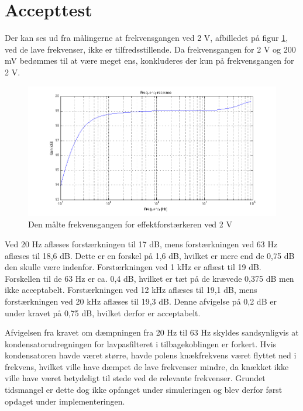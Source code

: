\section{Accepttest}
Der kan ses ud fra målingerne at frekvensgangen ved 2 V, afbilledet på figur \ref{fig:acceff:frek2v}, ved de lave frekvenser, ikke er tilfredsstillende. Da frekvensgangen for 2 V og 200 mV bedømmes til at være meget ens, konkluderes der kun på frekvensgangen for 2 V.

\begin{figure}[h]
\centering
\includegraphics[width=\textwidth]{maalerapporter/effektforstaerker/2V-45mA-uden-modstand-frek.png}
\caption{Den målte frekvensgangen for effektforstærkeren ved 2 V}
\label{fig:acceff:frek2v}
\end{figure}

Ved 20 Hz aflæses forstærkningen til 17 dB, mens forstærkningen ved 63 Hz aflæses til 18,6 dB. Dette er en forskel på 1,6 dB, hvilket er mere end de 0,75 dB den skulle være indenfor. Forstærkningen ved 1 kHz er aflæst til 19 dB. Forskellen til de 63 Hz er ca. 0,4 dB, hvilket er tæt på de krævede 0,375 dB men ikke acceptabelt. Forstærkningen ved 12 kHz aflæses til 19,1 dB, mens forstærkningen ved 20 kHz aflæses til 19,3 dB. Denne afvigelse på 0,2 dB er under kravet på 0,75 dB, hvilket derfor er acceptabelt.

Afvigelsen fra kravet om dæmpningen fra 20 Hz til 63 Hz skyldes sandsynligvis at kondensatorudregningen for lavpasfilteret i tilbagekoblingen er forkert. Hvis kondensatoren havde været større, havde polens knækfrekvens været flyttet ned i frekvens, hvilket ville have dæmpet de lave frekvenser mindre, da knækket ikke ville have været betydeligt til stede ved de relevante frekvenser. Grundet tidsmangel er dette dog ikke opfanget under simuleringen og blev derfor først opdaget under implementeringen.

